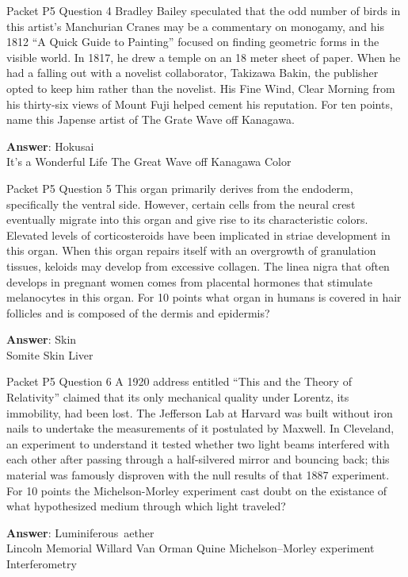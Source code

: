 \begin{frame}{Packet P5 Question 4}
Bradley Bailey speculated   that the odd number of birds in this artist's Manchurian Cranes may be a commentary on monogamy, and his 1812 ``A Quick Guide to Painting'' focused on finding geometric forms in the visible world.   In 1817, he drew a temple on an 18 meter sheet of paper.  When he had a falling out with a novelist collaborator, Takizawa Bakin, the publisher opted to keep him rather than the novelist.  His Fine Wind, Clear Morning from   his thirty-six views of Mount Fuji helped     cement his reputation.  For ten points, name this Japense artist of The Grate Wave off Kanagawa.  

\textbf{Answer}: Hokusai\\
 It's a Wonderful Life
 The Great Wave off Kanagawa
 Color
\end{frame}

\begin{frame}{Packet P5 Question 5}
This organ primarily derives   from the endoderm, specifically the ventral side. However, certain cells from the neural crest eventually migrate into this organ and give rise to its characteristic colors. Elevated levels of corticosteroids have been implicated in striae development in this organ. When this   organ repairs itself with an overgrowth of granulation tissues, keloids may develop from excessive collagen. The linea nigra that often develops in pregnant women comes from placental hormones that stimulate melanocytes in this organ. For 10 points what organ in humans is covered in hair follicles and is composed of   the dermis and epidermis?    

\textbf{Answer}: Skin\\
 Somite
 Skin
 Liver
\end{frame}

\begin{frame}{Packet P5 Question 6}
A 1920 address entitled   ``This and the Theory of Relativity'' claimed that its only mechanical quality under Lorentz, its immobility, had been lost. The Jefferson Lab at Harvard was built   without iron nails to undertake the measurements of it postulated by Maxwell. In Cleveland, an experiment to understand it tested whether two light beams interfered with each other after passing through a half-silvered mirror and bouncing   back; this material was famously disproven with the null results of that 1887 experiment. For 10 points the Michelson-Morley   experiment cast     doubt on the existance of what hypothesized medium through   which light traveled?

\textbf{Answer}: Luminiferous\ aether\\
 Lincoln Memorial
 Willard Van Orman Quine
 Michelson–Morley experiment
 Interferometry
\end{frame}

